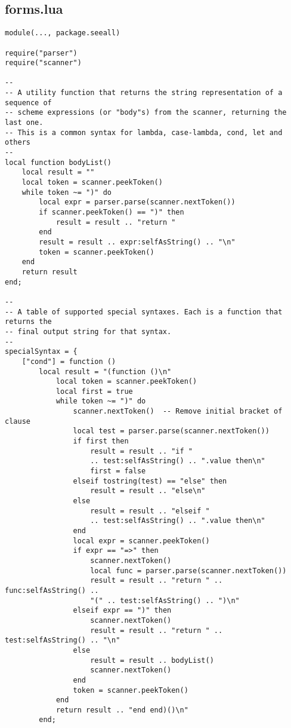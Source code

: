 \subsection{forms.lua}
\begin{verbatim}
module(..., package.seeall)

require("parser")
require("scanner")

--
-- A utility function that returns the string representation of a sequence of
-- scheme expressions (or "body"s) from the scanner, returning the last one.
-- This is a common syntax for lambda, case-lambda, cond, let and others
--
local function bodyList()
    local result = ""
    local token = scanner.peekToken()
    while token ~= ")" do
        local expr = parser.parse(scanner.nextToken())
        if scanner.peekToken() == ")" then
            result = result .. "return "
        end
        result = result .. expr:selfAsString() .. "\n"
        token = scanner.peekToken()
    end
    return result
end;

--
-- A table of supported special syntaxes. Each is a function that returns the
-- final output string for that syntax.
--
specialSyntax = {
    ["cond"] = function ()
        local result = "(function ()\n"
            local token = scanner.peekToken()
            local first = true
            while token ~= ")" do
                scanner.nextToken()  -- Remove initial bracket of clause
                local test = parser.parse(scanner.nextToken())
                if first then
                    result = result .. "if "
                    .. test:selfAsString() .. ".value then\n"
                    first = false
                elseif tostring(test) == "else" then
                    result = result .. "else\n"
                else
                    result = result .. "elseif "
                    .. test:selfAsString() .. ".value then\n"
                end
                local expr = scanner.peekToken()
                if expr == "=>" then
                    scanner.nextToken()
                    local func = parser.parse(scanner.nextToken())
                    result = result .. "return " .. func:selfAsString() ..
                    "(" .. test:selfAsString() .. ")\n"
                elseif expr == ")" then
                    scanner.nextToken()
                    result = result .. "return " .. test:selfAsString() .. "\n"
                else
                    result = result .. bodyList()
                    scanner.nextToken()
                end
                token = scanner.peekToken()
            end
            return result .. "end end)()\n"
        end;


\end{verbatim}
